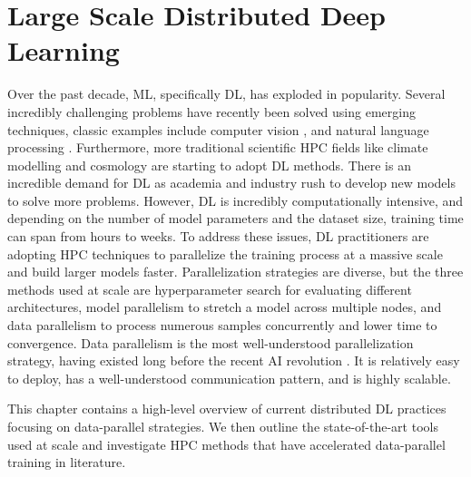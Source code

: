 
\chapter[Large Scale Distributed Deep Learning]{Large Scale Distributed Deep Learning}\label{ch:CH3-DistributedDL}
Over the past decade, \gls{ML}, specifically \gls{DL}, has exploded in popularity.
Several incredibly challenging problems have recently been solved using emerging techniques, classic examples include computer vision \cite{Krizhevsky2012AlexNet}, and natural language processing \cite{Vaswani2017AttentionTransformer}.
Furthermore, more traditional scientific \gls{HPC} fields like climate modelling \cite{Ham2019DLENSOForcasts} and cosmology \cite{Mathuriya2019Cosmoflow} are starting to adopt \gls{DL} methods.
There is an incredible demand for \gls{DL} as academia and industry rush to develop new models to solve more problems.
However, \gls{DL} is incredibly computationally intensive, and depending on the number of model parameters and the dataset size, training time can span from hours to weeks.
To address these issues, \gls{DL} practitioners are adopting \gls{HPC} techniques to parallelize the training process at a massive scale and build larger models faster.
Parallelization strategies are diverse, but the three methods used at scale are hyperparameter search for evaluating different architectures, model parallelism to stretch a model across multiple nodes, and data parallelism to process numerous samples concurrently and lower time to convergence.
Data parallelism is the most well-understood parallelization strategy, having existed long before the recent AI revolution \cite{Zhang1990BPonCM2}.
It is relatively easy to deploy, has a well-understood communication pattern, and is highly scalable.

This chapter contains a high-level overview of current distributed \gls{DL} practices focusing on data-parallel strategies.
We then outline the state-of-the-art tools used at scale and investigate \gls{HPC} methods that have accelerated data-parallel training in literature.

